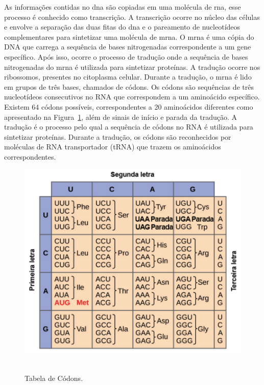 As informações contidas no \gls{dna} são copiadas em uma molécula de \gls{rna}, esse processo é conhecido como transcrição. A transcrição ocorre no núcleo das células e envolve a separação das duas fitas do \gls{dna} e o pareamento de nucleotídeos complementares para sintetizar uma molécula de \gls{mrna}. O \gls{mrna} é uma cópia do DNA que carrega a sequência de bases nitrogenadas correspondente a um gene específico.
Após isso, ocorre o processo de tradução onde a sequência de bases nitrogenadas do \gls{mrna} é utilizada para sintetizar proteínas. A tradução ocorre nos ribossomos, presentes no citoplasma celular. Durante a tradução, o \gls{mrna} é lido em grupos de três bases, chamados de códons. Os códons são sequências de três nucleotídeos consecutivos no RNA que correspondem a um aminoácido específico. Existem 64 códons possíveis, correspondentes a 20 aminoácidos diferentes como apresentado na Figura~\ref{fig:tabelaCodons}, além de sinais de início e parada da tradução. A tradução é o processo pelo qual a sequência de códons no RNA é utilizada para sintetizar proteínas. Durante a tradução, os códons são reconhecidos por moléculas de RNA transportador (tRNA) que trazem os aminoácidos correspondentes.
\begin{figure}[htb]
  \centering
  \caption{Tabela de Códons.}
  \includegraphics[scale=0.6]{figuras/tabelaCodons.pdf}
  ~\label{fig:tabelaCodons}
\end{figure}

